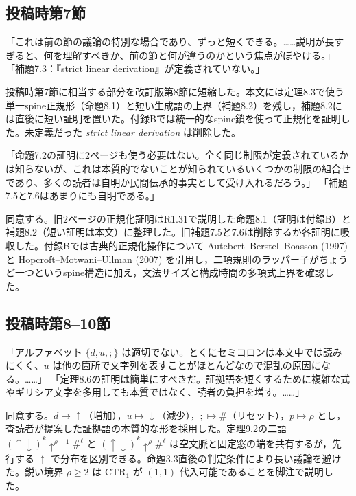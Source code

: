 
\subsection*{投稿時第7節}
「これは前の節の議論の特別な場合であり、ずっと短くできる。……説明が長すぎると、何を理解すべきか、前の節と何が違うのかという焦点がぼやける。」
「補題7.3：『strict linear derivation』が定義されていない。」

\Reply
投稿時第7節に相当する部分を改訂版第8節に短縮した。本文には定理8.3で使う単一spine正規形（命題8.1）と短い生成語の上界（補題8.2）を残し，補題8.2には直後に短い証明を置いた。付録Bでは統一的なspine鎖を使って正規化を証明した。未定義だった \emph{strict linear derivation} は削除した。

「命題7.2の証明に2ページも使う必要はない。全く同じ制限が定義されているかは知らないが、これは本質的でないことが知られているいくつかの制限の組合せであり、多くの読者は自明か民間伝承的事実として受け入れるだろう。」
「補題7.5と7.6はあまりにも自明である。」

\Reply
同意する。旧2ページの正規化証明はR1.31で説明した命題8.1（証明は付録B）と補題8.2（短い証明は本文）に整理した。旧補題7.5と7.6は削除するか各証明に吸収した。付録Bでは古典的正規化操作について Autebert--Berstel--Boasson (1997) と Hopcroft--Motwani--Ullman (2007) を引用し，二項規則のラッパー子がちょうど一つというspine構造に加え，文法サイズと構成時間の多項式上界を確認した。

\subsection*{投稿時第8--10節}
「アルファベット $\{d,u,;\}$ は適切でない。とくにセミコロンは本文中では読みにくく、$u$ は他の箇所で文字列を表すことがほとんどなので混乱の原因になる。……」
「定理8.6の証明は簡単にすべきだ。証拠語を短くするために複雑な式やギリシア文字を多用しても本質ではなく、読者の負担を増す。……」

\Reply
同意する。$d\mapsto\uparrow$（増加），$u\mapsto\downarrow$（減少），$;\mapsto\#$（リセット），$p\mapsto\rho$ とし，査読者が提案した証拠語の本質的な形を採用した。定理9.2の二語 $(\uparrow\downarrow)^k\uparrow^{\rho-1}\#^\ell$ と $(\uparrow\downarrow)^k\uparrow^\rho\#^\ell$ は空文脈と固定窓の端を共有するが，先行する $\uparrow$ で分布を区別できる。命題3.3直後の判定条件により長い議論を避けた。鋭い境界 $\rho\ge2$ は $\mathrm{CTR}_1$ が $(1,1)$-代入可能であることを脚注で説明した。

